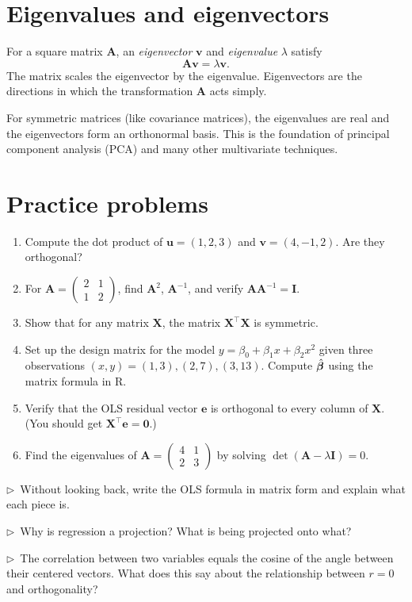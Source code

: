 \section{Eigenvalues and eigenvectors}

For a square matrix $\bm{A}$, an \emph{eigenvector} $\bm{v}$ and \emph{eigenvalue} $\lambda$ satisfy
\begin{equation}
  \bm{A}\bm{v} = \lambda \bm{v}.
  \label{eq:eigen}
\end{equation}
The matrix scales the eigenvector by the eigenvalue. Eigenvectors are the directions in which the transformation $\bm{A}$ acts simply.

For symmetric matrices (like covariance matrices), the eigenvalues are real and the eigenvectors form an orthonormal basis. This is the foundation of principal component analysis (PCA) and many other multivariate techniques.

\section{Practice problems}

\begin{enumerate}
  \item Compute the dot product of $\bm{u} = (1, 2, 3)$ and $\bm{v} = (4, -1, 2)$. Are they orthogonal?
  \item For $\bm{A} = \begin{pmatrix} 2 & 1 \\ 1 & 2 \end{pmatrix}$, find $\bm{A}^2$, $\bm{A}^{-1}$, and verify $\bm{A}\bm{A}^{-1} = \bm{I}$.
  \item Show that for any matrix $\bm{X}$, the matrix $\bm{X}^\top \bm{X}$ is symmetric.
  \item Set up the design matrix for the model $y = \beta_0 + \beta_1 x + \beta_2 x^2$ given three observations $(x, y) = (1, 3), (2, 7), (3, 13)$. Compute $\hat{\bm{\beta}}$ using the matrix formula in R.
  \item Verify that the OLS residual vector $\bm{e}$ is orthogonal to every column of $\bm{X}$. (You should get $\bm{X}^\top \bm{e} = \bm{0}$.)
  \item Find the eigenvalues of $\bm{A} = \begin{pmatrix} 4 & 1 \\ 2 & 3 \end{pmatrix}$ by solving $\det(\bm{A} - \lambda \bm{I}) = 0$.
\end{enumerate}

\begin{reflect}
$\triangleright$~Without looking back, write the OLS formula in matrix form and explain what each piece is.

\smallskip
$\triangleright$~Why is regression a projection? What is being projected onto what?

\smallskip
$\triangleright$~The correlation between two variables equals the cosine of the angle between their centered vectors. What does this say about the relationship between $r = 0$ and orthogonality?
\end{reflect}
